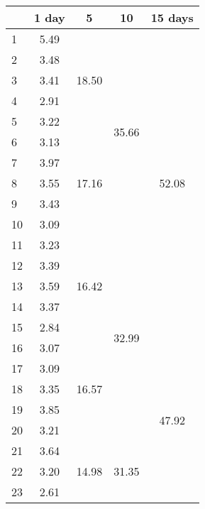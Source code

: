 \begin{center}
\begin{tabular}{| l || c | c | c | c |}\hline
 & 1 day & 5 & 10 & 15 days \\\hline
1 & \multirow{1}{*}{ 5.49 }  & \multirow{5}{*}{ 18.50 }  & \multirow{10}{*}{ 35.66 }  & \multirow{15}{*}{ 52.08 }  \\\cline{2-2}
2 & \multirow{1}{*}{ 3.48 }  & & & \\\cline{2-2}
3 & \multirow{1}{*}{ 3.41 }  & & & \\\cline{2-2}
4 & \multirow{1}{*}{ 2.91 }  & & & \\\cline{2-2}
5 & \multirow{1}{*}{ 3.22 }  & & & \\\cline{2-2}\cline{3-3}
6 & \multirow{1}{*}{ 3.13 }  & \multirow{5}{*}{ 17.16 }  & & \\\cline{2-2}
7 & \multirow{1}{*}{ 3.97 }  & & & \\\cline{2-2}
8 & \multirow{1}{*}{ 3.55 }  & & & \\\cline{2-2}
9 & \multirow{1}{*}{ 3.43 }  & & & \\\cline{2-2}
10 & \multirow{1}{*}{ 3.09 }  & & & \\\cline{2-2}\cline{3-3}\cline{4-4}
11 & \multirow{1}{*}{ 3.23 }  & \multirow{5}{*}{ 16.42 }  & \multirow{10}{*}{ 32.99 }  & \\\cline{2-2}
12 & \multirow{1}{*}{ 3.39 }  & & & \\\cline{2-2}
13 & \multirow{1}{*}{ 3.59 }  & & & \\\cline{2-2}
14 & \multirow{1}{*}{ 3.37 }  & & & \\\cline{2-2}
15 & \multirow{1}{*}{ 2.84 }  & & & \\\cline{2-2}\cline{3-3}\cline{5-5}
16 & \multirow{1}{*}{ 3.07 }  & \multirow{5}{*}{ 16.57 }  & & \multirow{15}{*}{ 47.92 }  \\\cline{2-2}
17 & \multirow{1}{*}{ 3.09 }  & & & \\\cline{2-2}
18 & \multirow{1}{*}{ 3.35 }  & & & \\\cline{2-2}
19 & \multirow{1}{*}{ 3.85 }  & & & \\\cline{2-2}
20 & \multirow{1}{*}{ 3.21 }  & & & \\\cline{2-2}\cline{3-3}\cline{4-4}
21 & \multirow{1}{*}{ 3.64 }  & \multirow{5}{*}{ 14.98 }  & \multirow{10}{*}{ 31.35 }  & \\\cline{2-2}
22 & \multirow{1}{*}{ 3.20 }  & & & \\\cline{2-2}
23 & \multirow{1}{*}{ 2.61 }  & & & \\\cline{2-2}

\end{tabular}
\end{center}
